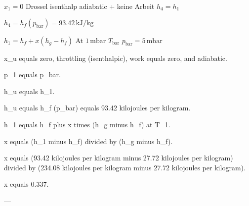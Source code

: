 \( x_1 = 0 \)  
Drossel isenthalp adiabatic + keine Arbeit \( h_4 = h_1 \)  

\( h_4 = h_f(p_{\text{bar}}) = 93.42 \, \text{kJ/kg} \)  

\( h_1 = h_f + x(h_g - h_f) \)  
At \( 1 \, \text{mbar} \)  
\( T_{\text{bar}} \)  
\( p_{\text{bar}} = 5 \, \text{mbar} \)

x_u equals zero, throttling (isenthalpic), work equals zero, and adiabatic.  

p_1 equals p_bar.  

h_u equals h_1.  

h_u equals h_f (p_bar) equals 93.42 kilojoules per kilogram.  

h_1 equals h_f plus x times (h_g minus h_f) at T_1.  

x equals (h_1 minus h_f) divided by (h_g minus h_f).  

x equals (93.42 kilojoules per kilogram minus 27.72 kilojoules per kilogram) divided by (234.08 kilojoules per kilogram minus 27.72 kilojoules per kilogram).  

x equals 0.337.  

---